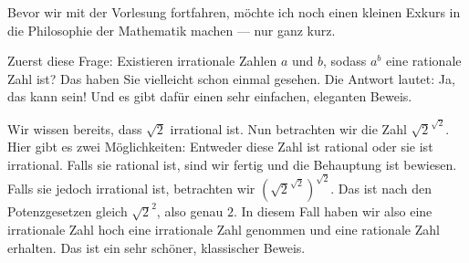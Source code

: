 \begin{spoken-clean}[00:00:39 - 00:01:08]
Bevor wir mit der Vorlesung fortfahren, möchte ich noch einen kleinen Exkurs in die Philosophie der Mathematik machen --- nur ganz kurz.

Zuerst diese Frage: Existieren irrationale Zahlen $a$ und $b$, sodass $a^b$ eine rationale Zahl ist? Das haben Sie vielleicht schon einmal gesehen. Die Antwort lautet: Ja, das kann sein! Und es gibt dafür einen sehr einfachen, eleganten Beweis.

Wir wissen bereits, dass $\sqrt{2}$ irrational ist. Nun betrachten wir die Zahl $\sqrt{2}^{\sqrt{2}}$. Hier gibt es zwei Möglichkeiten: Entweder diese Zahl ist rational oder sie ist irrational. Falls sie rational ist, sind wir fertig und die Behauptung ist bewiesen. Falls sie jedoch irrational ist, betrachten wir $\left(\sqrt{2}^{\sqrt{2}}\right)^{\sqrt{2}}$. Das ist nach den Potenzgesetzen gleich $\sqrt{2}^2$, also genau $2$. In diesem Fall haben wir also eine irrationale Zahl hoch eine irrationale Zahl genommen und eine rationale Zahl erhalten. Das ist ein sehr schöner, klassischer Beweis.
\end{spoken-clean}

